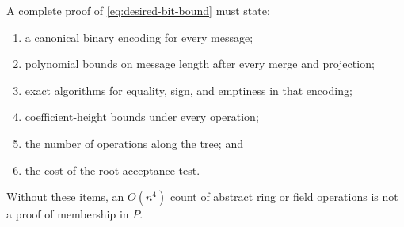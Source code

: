 A complete proof of \cref{eq:desired-bit-bound} must state:
\begin{enumerate}
  \item a canonical binary encoding for every message;
  \item polynomial bounds on message length after every merge and projection;
  \item exact algorithms for equality, sign, and emptiness in that encoding;
  \item coefficient-height bounds under every operation;
  \item the number of operations along the tree; and
  \item the cost of the root acceptance test.
\end{enumerate}
Without these items, an \(O(n^4)\) count of abstract ring or field operations is
not a proof of membership in \(P\).
